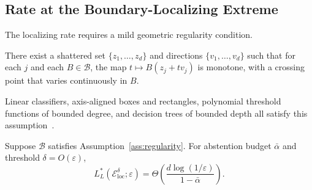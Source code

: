 \documentclass[runningheads,envcountsame]{llncs}
\newcommand{\cB}{\mathcal{B}}
\newcommand{\cE}{\mathcal{E}}
\newcommand{\eps}{\varepsilon}
\begin{document}
\subsection{Rate at the Boundary-Localizing Extreme}
\label{sec:loc-rate}

The localizing rate requires a mild geometric regularity condition.

\begin{assumption}
\label{ass:regularity}
\sloppy There exist a shattered set $\{z_1, \ldots, z_d\}$ and directions $\{v_1, \ldots, v_d\}$ such that for each $j$ and each $B \in \cB$, the map $t \mapsto B(z_j + t v_j)$ is monotone, with a crossing point that varies continuously in $B$.
\end{assumption}

Linear classifiers, axis-aligned boxes and rectangles, polynomial threshold functions of bounded degree, and decision trees of bounded depth all satisfy this assumption~\cite{hanneke2014theory}.

\begin{theorem}
\label{thm:learner-value-loc}
Suppose $\cB$ satisfies Assumption~\ref{ass:regularity}. For abstention budget $\bar\alpha$ and threshold $\delta = O(\eps)$,
\[
L^*_L(\cE_{\mathrm{loc}}^\delta; \eps) = \Theta\!\left(\frac{d \log(1/\eps)}{1 - \bar\alpha}\right).
\]
\end{theorem}
\end{document}
